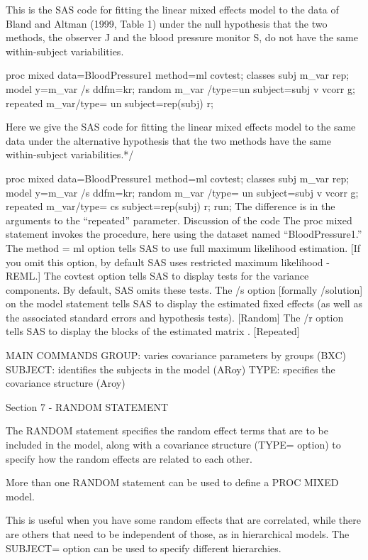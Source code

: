 This is the SAS code for fitting the linear mixed effects model to the data of Bland and Altman (1999, Table 1) under the null hypothesis that the two methods, the observer J and the blood pressure monitor S, do not have the same within-subject variabilities. 

proc mixed data=BloodPressure1 method=ml covtest;
classes subj m_var rep;
model y=m_var /s ddfm=kr;
random m_var /type=un subject=subj v vcorr g;
repeated m_var/type= un subject=rep(subj) r;


Here we give the SAS code for fitting the linear mixed effects model to the same data under the alternative hypothesis that the two methods have the same within-subject variabilities.*/

proc mixed data=BloodPressure1 method=ml covtest;
classes subj m_var rep;
model y=m_var /s ddfm=kr;
random m_var /type= un subject=subj v vcorr g;
repeated m_var/type= cs subject=rep(subj) r;
run;
The difference is in the arguments to the “repeated” parameter.
Discussion of the code
The proc mixed statement invokes the procedure, here using the dataset named “BloodPressure1.”
The method = ml option tells SAS to use full maximum likelihood estimation. [If you omit this option, by default SAS uses restricted maximum likelihood - REML.]
The covtest option tells SAS to display tests for the variance components.  By default, SAS omits these tests.
The /s option [formally /solution] on the model statement tells SAS to display the estimated fixed effects (as well as the associated standard errors and hypothesis tests). [Random]
The /r option tells SAS to display the blocks of the estimated  matrix . [Repeated]

MAIN COMMANDS
GROUP:		 varies covariance parameters by groups  	(BXC)
SUBJECT:	 identifies the subjects in the model 		(ARoy)
TYPE: 		 specifies the covariance structure 		(Aroy)

Section 7 - RANDOM STATEMENT

The RANDOM statement specifies the random effect terms that are to be included in the model, along with a
covariance structure (TYPE= option) to specify how the random effects are related to each other. 

More than one RANDOM statement can be used to define a PROC MIXED model. 

This is useful when you have some random effects that are correlated, while there are others that need to be independent of those, as in hierarchical models. The SUBJECT= option can be used to specify different hierarchies.

